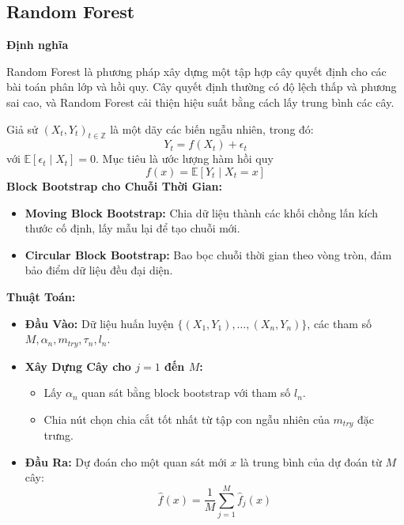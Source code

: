 \subsection{Random Forest}

\textbf{Định nghĩa}

Random Forest là phương pháp xây dựng một tập hợp cây quyết định cho các bài toán phân lớp và hồi quy. Cây quyết định thường có độ lệch thấp và phương sai cao, và Random Forest cải thiện hiệu suất bằng cách lấy trung bình các cây.

Giả sử \((X_t, Y_t)_{t \in \mathbb{Z}}\) là một dãy các biến ngẫu nhiên, trong đó:
\[ Y_t = f(X_t) + \epsilon_t \]
với \( \mathbb{E}[\epsilon_t \mid X_t] = 0 \). Mục tiêu là ước lượng hàm hồi quy 
\[ f(x) = \mathbb{E}[Y_t \mid X_t = x] \]
\textbf{Block Bootstrap cho Chuỗi Thời Gian:}
\begin{itemize}
    \item \textbf{Moving Block Bootstrap:} Chia dữ liệu thành các khối chồng lấn kích thước cố định, lấy mẫu lại để tạo chuỗi mới.
    \item \textbf{Circular Block Bootstrap:} Bao bọc chuỗi thời gian theo vòng tròn, đảm bảo điểm dữ liệu đều đại diện.
\end{itemize}
\textbf{Thuật Toán:}
\begin{itemize}
    \item \textbf{Đầu Vào:} Dữ liệu huấn luyện \( \{ (X_1, Y_1), \ldots, (X_n, Y_n) \} \), các tham số \( M, \alpha_n, m_{try}, \tau_n, l_n \).
    \item \textbf{Xây Dựng Cây cho \( j = 1 \) đến \( M \):}
    \begin{itemize}
        \item Lấy \( \alpha_n \) quan sát bằng block bootstrap với tham số \( l_n \).
        \item Chia nút chọn chia cắt tốt nhất từ tập con ngẫu nhiên của \( m_{try} \) đặc trưng.
    \end{itemize}
    \item \textbf{Đầu Ra:} Dự đoán cho một quan sát mới \( x \) là trung bình của dự đoán từ \( M \) cây:
    \[ \hat{f}(x) = \frac{1}{M} \sum_{j=1}^{M} \hat{f}_j(x) \]
\end{itemize}
